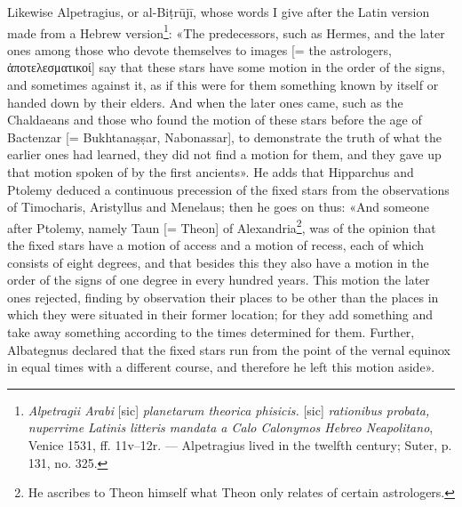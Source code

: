 \documentclass[11pt]{article}
\newcommand{\Pg}[1]{\marginpar{\footnotesize\color{gray}#1}}
\begin{document}
\par \Pg{I 299}Likewise Alpetragius, or al-Biṭrūjī, whose words I give after the Latin version made from a Hebrew version\footnote{\emph{Alpetragii Arabi} [sic] \emph{planetarum theorica phisicis.} [sic] \emph{rationibus probata, nuperrime Latinis litteris mandata a Calo Calonymos Hebreo Neapolitano}, Venice 1531, ff. 11v–12r. — Alpetragius lived in the twelfth century; Suter, p. 131, no. 325.}: «The predecessors, such as Hermes, and the later ones among those who devote themselves to images [= the astrologers, {\greekfont ἀποτελεσματικοί}] say that these stars have some motion in the order of the signs, and sometimes against it, as if this were for them something known by itself or handed down by their elders. And when the later ones came, such as the Chaldaeans and those who found the motion of these stars before the age of Bactenzar [= Bukhtanaṣṣar, Nabonassar], to demonstrate the truth of what the earlier ones had learned, they did not find a motion for them, and they gave up that motion spoken of by the first ancients». He adds that Hipparchus and Ptolemy deduced a continuous precession of the fixed stars from the observations of Timocharis, Aristyllus and Menelaus; then he goes on thus: «And someone after Ptolemy, namely Taun [= Theon] of Alexandria\footnote{He ascribes to Theon himself what Theon only relates of certain astrologers.}, was of the opinion that the fixed stars have a motion of access and a motion of recess, each of which consists of eight degrees, and that besides this they also have a motion in the order of the signs of one degree in every hundred years. This motion the later ones rejected, finding by observation their places to be other than the places in which they were situated in their former location; for they add something and take away something according to the times determined for them. Further, Albategnus declared that the fixed stars run from the point of the vernal equinox in equal times with a different course, and therefore he left this motion aside».\par
\end{document}
